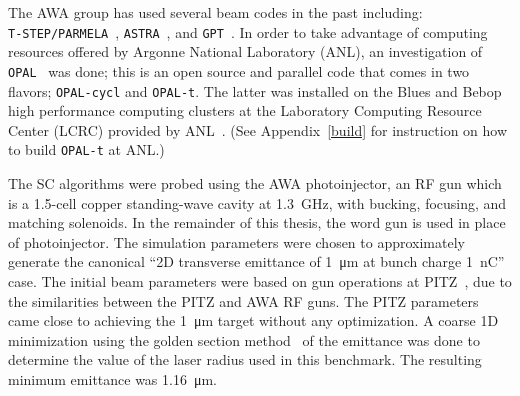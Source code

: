 The AWA group has used several beam codes in the past including:\\
\verb|T-STEP/PARMELA|~\cite{parmela}, \verb|ASTRA|~\cite{astra}, and \verb|GPT|~\cite{gpt}.  
In order to take advantage of computing resources offered by 
Argonne National Laboratory (ANL), an investigation of 
\verb|OPAL|~\cite{opal} was done; this is an open source and parallel code that comes in two flavors;  
\verb|OPAL-cycl| and \verb|OPAL-t|. The latter was installed on the Blues and Bebop high performance computing clusters
at the Laboratory Computing Resource Center (LCRC) provided by ANL~\cite{lcrc}.
(See Appendix~\ref{build} for instruction on how to build \verb|OPAL-t| at ANL.)

The SC algorithms were probed using the AWA photoinjector, 
an RF gun which is a 1.5-cell copper standing-wave cavity at \SI{1.3}{GHz}, 
with bucking, focusing, and matching solenoids. 
In the remainder of this thesis, the word gun is used 
in place of photoinjector. The simulation parameters were chosen to 
approximately generate the canonical ``2D transverse emittance of
\SI{1}{\micro\metre} at bunch charge \SI{1}{nC}'' case.  
The initial beam parameters were based on gun operations at PITZ~\cite{pitz},
due to the similarities between the PITZ and AWA RF guns.
The PITZ parameters came close to achieving the \SI{1}{\micro\metre}
target without any optimization. A coarse 1D minimization
using the golden section method~\cite{golden} of the 
emittance was done to determine the value of the laser radius 
used in this benchmark. The resulting minimum emittance was   
\SI{1.16}{\micro\metre}. 

